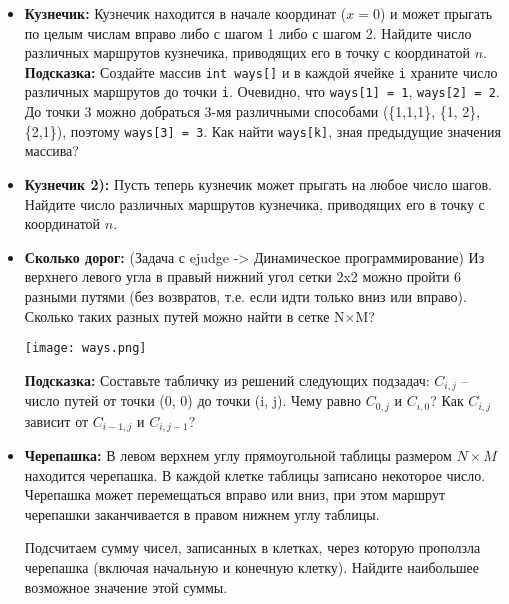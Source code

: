 \documentclass{article}
\begin{document}
\begin{itemize}
\item \textbf{Кузнечик:} Кузнечик находится в начале координат ($x = 0$) и может прыгать по целым числам вправо либо с шагом 1 либо с шагом 2. Найдите число различных маршрутов кузнечика, приводящих его в точку с координатой $n$. \\
\textbf{Подсказка:} Создайте массив \texttt{int ways[]} и в каждой ячейке \texttt{i} храните число различных маршрутов до точки \texttt{i}. Очевидно, что \texttt{ways[1] = 1}, \texttt{ways[2] = 2}. До точки 3 можно добраться 3-мя различными способами (\{1,1,1\}, \{1, 2\}, \{2,1\}), поэтому \texttt{ways[3] = 3}. Как найти \texttt{ways[k]}, зная предыдущие значения массива?
 \item \textbf{Кузнечик 2):} Пусть теперь кузнечик может прыгать на любое число шагов. Найдите число различных маршрутов кузнечика, приводящих его в точку с координатой $n$.

\item \textbf{Сколько дорог:}
(Задача с ejudge -> Динамическое программирование) Из верхнего левого угла в правый нижний угол сетки 2x2 можно пройти 6 разными путями (без возвратов, т.е. если идти только вниз или вправо). Сколько таких разных путей можно найти в сетке N×M?
\begin{center}
\texttt{[image: ways.png]}
\end{center}
\textbf{Подсказка:} Составьте табличку из решений следующих подзадач: $C_{i, j}$ -- число путей от точки (0, 0) до точки (i, j). Чему равно $C_{0, j}$ и $C_{i, 0}$? Как $C_{i, j}$ зависит от $C_{i-1, j}$ и $C_{i, j-1}$?

\item \textbf{Черепашка:}
В левом верхнем углу прямоугольной таблицы размером $N \times M$ находится черепашка. В каждой клетке таблицы записано некоторое число. Черепашка может перемещаться вправо или вниз, при этом маршрут черепашки заканчивается в правом нижнем углу таблицы.

Подсчитаем сумму чисел, записанных в клетках, через которую проползла черепашка (включая начальную и конечную клетку). Найдите наибольшее возможное значение этой суммы.


\end{itemize}
\end{document}

